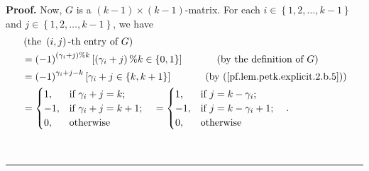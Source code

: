 \documentclass[numbers=enddot,12pt,final,onecolumn,notitlepage]{scrartcl}%
\theoremstyle{definition}
\newenvironment{proof}[1][Proof]{\noindent\textbf{#1.} }{\ \rule{0.5em}{0.5em}}
\begin{document}
\begin{proof}
Now, $G$ is a $\left(  k-1\right)  \times\left(  k-1\right)  $-matrix. For
each $i\in\left\{  1,2,\ldots,k-1\right\}  $ and $j\in\left\{  1,2,\ldots
,k-1\right\}  $, we have%
\begin{align*}
&  \left(  \text{the }\left(  i,j\right)  \text{-th entry of }G\right) \\
&  =\left(  -1\right)  ^{\left(  \gamma_{i}+j\right)  \%k}\left[  \left(
\gamma_{i}+j\right)  \%k\in\left\{  0,1\right\}  \right]
\ \ \ \ \ \ \ \ \ \ \left(  \text{by the definition of }G\right) \\
&  =\left(  -1\right)  ^{\gamma_{i}+j-k}\left[  \gamma_{i}+j\in\left\{
k,k+1\right\}  \right]  \ \ \ \ \ \ \ \ \ \ \left(  \text{by
(\ref{pf.lem.petk.explicit.2.b.5})}\right) \\
&  =%
\begin{cases}
1, & \text{if }\gamma_{i}+j=k;\\
-1, & \text{if }\gamma_{i}+j=k+1;\\
0, & \text{otherwise}%
\end{cases}
\quad=%
\begin{cases}
1, & \text{if }j=k-\gamma_{i};\\
-1, & \text{if }j=k-\gamma_{i}+1;\\
0, & \text{otherwise}%
\end{cases}
\ \ \ .
\end{align*}



\end{proof}
\end{document}
